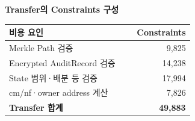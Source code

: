 \textbf{Transfer의 Constraints 구성}\par\smallskip
\begin{tabular}{@{}p{0.62\linewidth}r@{}}\toprule
    \textbf{비용 요인}           & \textbf{Constraints} \\
    \midrule
    Merkle Path 검증           & 9,825                \\
    Encrypted AuditRecord 검증 & 14,238               \\
    State 범위·배분 등 검증         & 17,994               \\
    cm/nf·owner address 계산   & 7,826                \\
    \midrule
    \textbf{Transfer 합계}     & \textbf{49,883}      \\
    \bottomrule
\end{tabular}\par\smallskip
